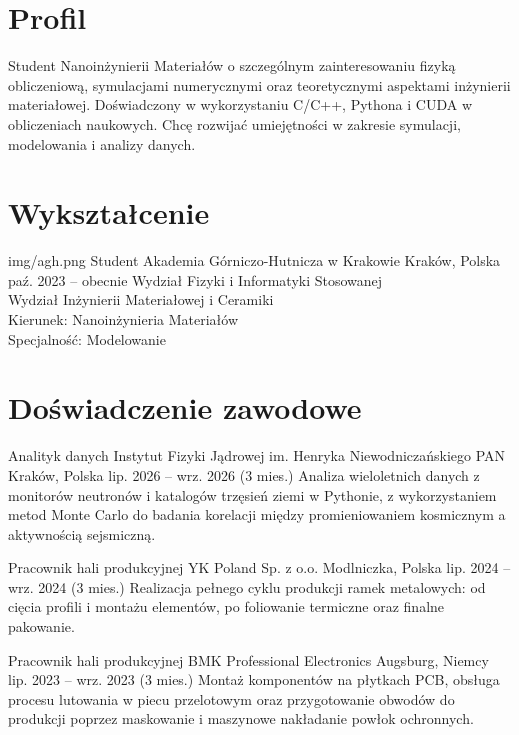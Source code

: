 \documentclass[final,a4paper,10pt,onecolumn]{article}
\begin{document}
\begin{cvmain}

\section{Profil}

Student Nanoinżynierii Materiałów o szczególnym zainteresowaniu fizyką obliczeniową, symulacjami numerycznymi oraz teoretycznymi aspektami inżynierii materiałowej.
Doświadczony w wykorzystaniu C/C++, Pythona i CUDA w obliczeniach naukowych. 
Chcę rozwijać umiejętności w zakresie symulacji, modelowania i analizy danych.

\section{Wykształcenie}

\eduentry
    {img/agh.png}
    {Student}
    {Akademia Górniczo-Hutnicza w Krakowie}
    {Kraków, Polska}
    {paź. 2023 -- obecnie}
    {Wydział Fizyki i Informatyki Stosowanej\\
    Wydział Inżynierii Materiałowej i Ceramiki\\
    Kierunek: Nanoinżynieria Materiałów\\
    Specjalność: Modelowanie}

\section{Doświadczenie zawodowe}

\jobentry
    {Analityk danych}
    {Instytut Fizyki Jądrowej im. Henryka Niewodniczańskiego PAN}
    {Kraków, Polska}
    {lip. 2026 -- wrz. 2026 (3 mies.)}
    {Analiza wieloletnich danych z monitorów neutronów i katalogów trzęsień ziemi w Pythonie, z wykorzystaniem metod Monte Carlo do badania korelacji między promieniowaniem kosmicznym a aktywnością sejsmiczną.}

\jobentry
    {Pracownik hali produkcyjnej}
    {YK Poland Sp. z o.o.}
    {Modlniczka, Polska}
    {lip. 2024 -- wrz. 2024 (3 mies.)}
    {Realizacja pełnego cyklu produkcji ramek metalowych: od cięcia profili i montażu elementów, po foliowanie termiczne oraz finalne pakowanie.}

\jobentry
    {Pracownik hali produkcyjnej}
    {BMK Professional Electronics}
    {Augsburg, Niemcy}
    {lip. 2023 -- wrz. 2023 (3 mies.)}
    {Montaż komponentów na płytkach PCB, obsługa procesu lutowania w piecu przelotowym oraz przygotowanie obwodów do produkcji poprzez maskowanie i maszynowe nakładanie powłok ochronnych.}


\end{cvmain}
\end{document}
